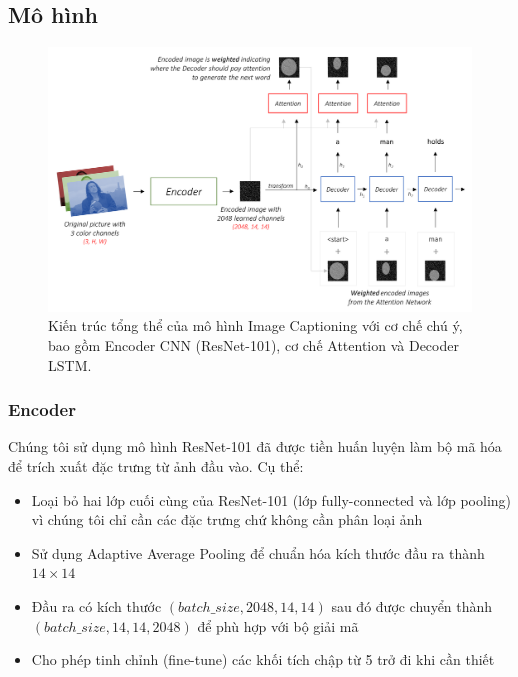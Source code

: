 \documentclass[conference]{IEEEtran}
\begin{document}
\subsection{Mô hình}
\begin{figure}[htbp]
    \centering
    \includegraphics[width=\linewidth]{attachments/model.png}
    \caption{Kiến trúc tổng thể của mô hình Image Captioning với cơ chế chú ý, bao gồm Encoder CNN (ResNet-101), cơ chế Attention và Decoder LSTM.}
    \label{fig:model}
\end{figure}
\subsubsection{Encoder}
Chúng tôi sử dụng mô hình ResNet-101 đã được tiền huấn luyện làm bộ mã hóa để trích xuất đặc trưng từ ảnh đầu vào. Cụ thể:
\begin{itemize}
    \item Loại bỏ hai lớp cuối cùng của ResNet-101 (lớp fully-connected và lớp pooling) vì chúng tôi chỉ cần các đặc trưng chứ không cần phân loại ảnh
    \item Sử dụng Adaptive Average Pooling để chuẩn hóa kích thước đầu ra thành $14 \times 14$
    \item Đầu ra có kích thước $(batch\_size, 2048, 14, 14)$ sau đó được chuyển thành $(batch\_size, 14, 14, 2048)$ để phù hợp với bộ giải mã
    \item Cho phép tinh chỉnh (fine-tune) các khối tích chập từ 5 trở đi khi cần thiết
\end{itemize}
\end{document}
